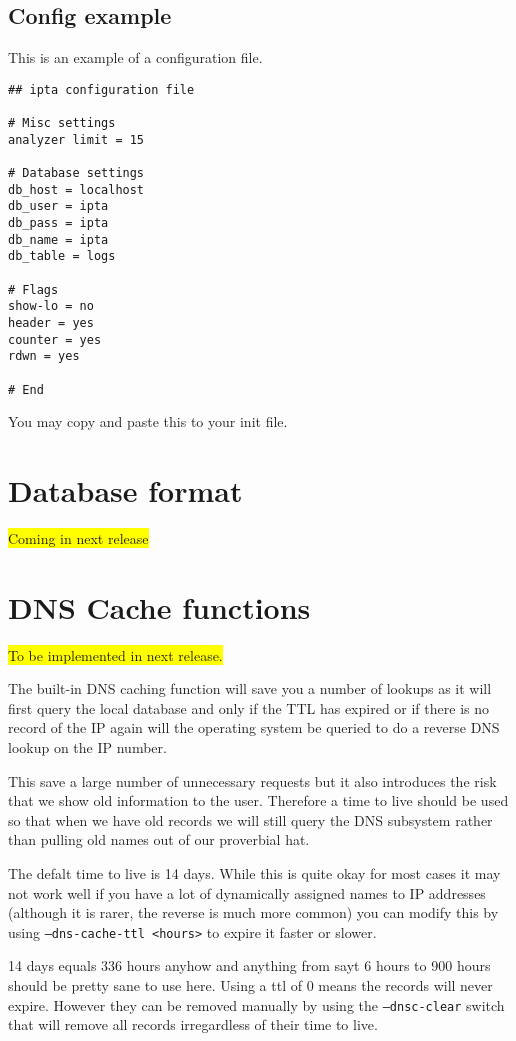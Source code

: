\documentclass[english,twoside,openright,a4paper,12pt]{article}
\newcommand{\hilight}[1]{\colorbox{yellow}{#1}}
\begin{document}
\subsection{Config example}

This is an example of a configuration file.
\scriptsize
\begin{verbatim}
## ipta configuration file

# Misc settings
analyzer limit = 15

# Database settings
db_host = localhost
db_user = ipta
db_pass = ipta
db_name = ipta
db_table = logs

# Flags
show-lo = no
header = yes
counter = yes
rdwn = yes

# End
\end{verbatim}
\normalsize

You may copy and paste this to your init file.

\section{Database format}

\hilight{Coming in next release}

\section{DNS Cache functions}

\hilight{To be implemented in next release.}

The built-in DNS caching function will save you a number of lookups as
it will first query the local database and only if the TTL has expired
or if there is no record of the IP again will the operating system be
queried to do a reverse DNS lookup on the IP number.

This save a large number of unnecessary requests but it also
introduces the risk that we show old information to the user.
Therefore a time to live should be used so that when we have old
records we will still query the DNS subsystem rather than pulling old
names out of our proverbial hat.

The defalt time to live is 14 days. While this is quite okay for most
cases it may not work well if you have a lot of dynamically assigned
names to IP addresses (although it is rarer, the reverse is much more
common) you can modify this by using \texttt{--dns-cache-ttl <hours>}
to expire it faster or slower.

14 days equals 336 hours anyhow and anything from sayt 6 hours to 900
hours should be pretty sane to use here. Using a ttl of 0 means the
records will never expire. However they can be removed manually by
using the \texttt{--dnsc-clear} switch that will remove all records
irregardless of their time to live.
\end{document}
